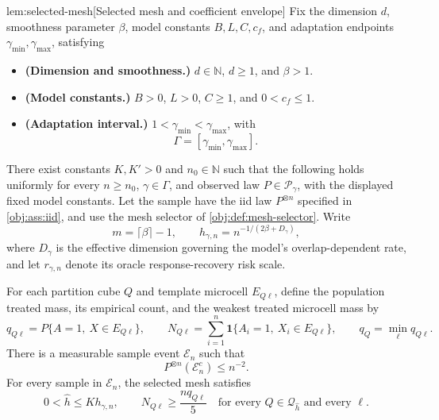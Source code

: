 \documentclass[11pt]{article}
\begin{document}
\begin{lemmav}{lem:selected-mesh}[Selected mesh and coefficient envelope]
Fix the dimension \(d\), smoothness parameter \(\beta\), model constants \(B,L,C,c_f\), and adaptation endpoints \(\gamma_{\min},\gamma_{\max}\), satisfying
\begin{itemize}
\item \textbf{(Dimension and smoothness.)} \(d\in\mathbb N\), \(d\ge1\), and \(\beta>1\).
\item \textbf{(Model constants.)} \(B>0\), \(L>0\), \(C\ge1\), and \(0<c_f\le1\).
\item \textbf{(Adaptation interval.)} \(1<\gamma_{\min}<\gamma_{\max}\), with
\[
\Gamma=[\gamma_{\min},\gamma_{\max}].
\]
\end{itemize}
There exist constants \(K,K'>0\) and \(n_0\in\mathbb N\) such that the following holds uniformly for every \(n\ge n_0\), \(\gamma\in\Gamma\), and observed law \(P\in\mathcal P_\gamma\), with the displayed fixed model constants. Let the sample have the iid law \(P^{\otimes n}\) specified in \cref{obj:ass:iid}, and use the mesh selector of \cref{obj:def:mesh-selector}. Write
\[
m=\lceil\beta\rceil-1,
\qquad
h_{\gamma,n}=n^{-1/(2\beta+D_\gamma)},
\]
where \(D_\gamma\) is the effective dimension governing the model's overlap-dependent rate, and let \(r_{\gamma,n}\) denote its oracle response-recovery risk scale.

For each partition cube \(Q\) and template microcell \(E_{Q\ell}\), define the population treated mass, its empirical count, and the weakest treated microcell mass by
\[
q_{Q\ell}=P\{A=1,\ X\in E_{Q\ell}\},
\qquad
N_{Q\ell}=\sum_{i=1}^n
\mathbf1\{A_i=1,\ X_i\in E_{Q\ell}\},
\qquad
q_Q=\min_\ell q_{Q\ell}.
\]
There is a measurable sample event \(\mathcal E_n\) such that
\[
P^{\otimes n}(\mathcal E_n^c)\le n^{-2}.
\]
For every sample in \(\mathcal E_n\), the selected mesh satisfies
\[
0<\widehat h\le K h_{\gamma,n},
\qquad
N_{Q\ell}\ge \frac{nq_{Q\ell}}5
\quad
\text{for every }Q\in\mathcal Q_{\widehat h}
\text{ and every }\ell.
\]


\end{lemmav}
\end{document}
